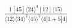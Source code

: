 \documentclass[varwidth, border=5pt]{standalone}
\begin{document}
\begin{my}
$\begin{gathered}
\scriptscriptstyle\frac{1[45]⟨24⟩^3[12]⟨15⟩}{⟨12⟩⟨34⟩^2⟨45⟩^2⟨4|1+5|4]}
\end{gathered}$
\end{my}
\end{document}

